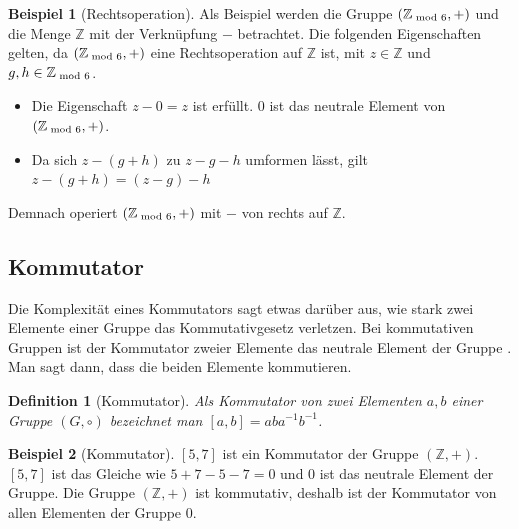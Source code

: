 \documentclass[12pt,a4paper, usenames, dvipsnames]{article}
\theoremstyle{mystyle}
\newtheorem{definition}{Definition}
\theoremstyle{definition}
\newtheorem{bsp}{Beispiel}[definition]
\begin{document}
\begin{bsp}[Rechtsoperation]

Als Beispiel werden die Gruppe $(\mathbb{Z}_{\hspace*{-0.3em}\mod 6}, +)$ und die Menge $\mathbb{Z}$ mit der Verknüpfung $-$ betrachtet. Die folgenden Eigenschaften gelten, da $(\mathbb{Z}_{\hspace*{-0.3em}\mod 6}, +)$ eine Rechtsoperation auf $\mathbb{Z}$ ist, mit $z \in  \mathbb{Z}$ und $g,h \in \mathbb{Z}_{\hspace*{-0.3em}\mod 6}$.
\begin{itemize}
\item Die Eigenschaft $z - 0 = z$ ist erfüllt. $0$ ist das neutrale Element von $(\mathbb{Z}_{\hspace*{-0.3em}\mod 6}, +)$.
\item Da sich $z-(g+h)$ zu $z-g-h$ umformen lässt, gilt $z-(g+h) = (z-g)-h$
\end{itemize}
Demnach operiert $(\mathbb{Z}_{\hspace*{-0.3em}\mod 6}, +)$ mit $-$ von rechts auf $\mathbb{Z}$.

\end{bsp}

%
%
%
%
%
%
%
%
%
%
%
%

\subsection{Kommutator} 
 \label{Abschnitt_Kommutator}
Die Komplexität eines Kommutators sagt etwas darüber aus, wie stark zwei Elemente einer Gruppe das Kommutativgesetz verletzen. Bei kommutativen Gruppen ist der Kommutator zweier Elemente das neutrale Element der Gruppe \cite{TD}. Man sagt dann, dass die beiden Elemente kommutieren. 


\begin{definition}[Kommutator]
Als Kommutator von zwei Elementen $a, b$ einer Gruppe $(G, \circ)$  bezeichnet man $[a,b] = aba^{-1}b^{-1}$.
\end{definition}


\begin{bsp}[Kommutator]

$[5,7]$ ist ein Kommutator der Gruppe $(\mathbb{Z}, +)$. $[5,7]$ ist das Gleiche wie $5+7-5-7 = 0$ und $0$ ist das neutrale Element der Gruppe. Die Gruppe $(\mathbb{Z}, +)$ ist kommutativ, deshalb ist der Kommutator von allen Elementen der Gruppe $0$.

\end{bsp}
%
%
%
%
%
%
%
%
%
%
%
%
%
\end{document}
